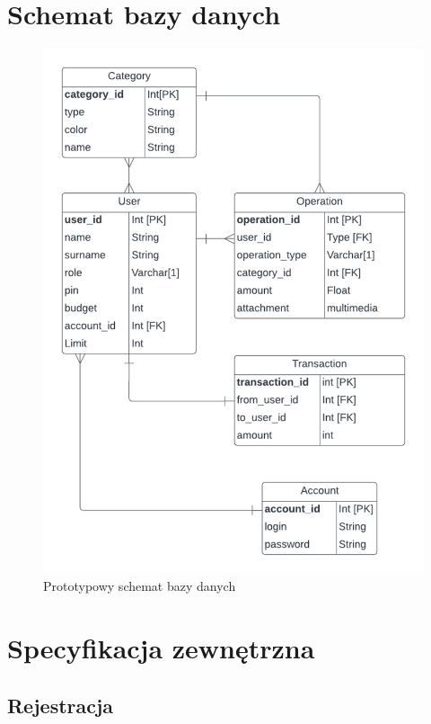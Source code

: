 \documentclass[12pt,a4paper,oneside]{article}
\begin{document}
\section{Schemat bazy danych}
\begin{figure}[H]
    \centering
    \includegraphics[width=\hsize,keepaspectratio]{images/DB1.png}
    \caption{Prototypowy schemat bazy danych}
\end{figure}

\section{Specyfikacja zewnętrzna}
\subsection{Rejestracja}
\end{document}
